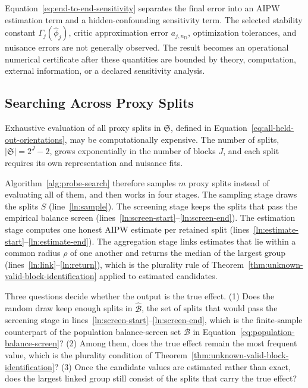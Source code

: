 Equation~\eqref{eq:end-to-end-sensitivity} separates the final error into an AIPW estimation term and a hidden-confounding sensitivity term. The selected stability constant $\Gamma_j(\widehat\phi_j)$, critic approximation error $a_{j,n_{\mathrm D}}$, optimization tolerances, and nuisance errors are not generally observed. The result becomes an operational numerical certificate after these quantities are bounded by theory, computation, external information, or a declared sensitivity analysis.

\subsection[Searching Across Proxy Splits]{Searching Across Proxy Splits}
\label{sec:random-orientation-search}
Exhaustive evaluation of all proxy splits in $\mathfrak S$, defined in Equation~\eqref{eq:all-held-out-orientations}, may be computationally expensive. The number of splits, $|\mathfrak S|=2^J-2$, grows exponentially in the number of blocks $J$, and each split requires its own representation and nuisance fits.

 Algorithm~\ref{alg:probe-search} therefore samples $m$ proxy splits instead of evaluating all of them, and then works in four stages. The sampling stage draws the splits $S$ (line~\ref{ln:sample}). The screening stage keeps the splits that pass the empirical balance screen (lines~\ref{ln:screen-start}--\ref{ln:screen-end}). The estimation stage computes one honest AIPW estimate per retained split (lines~\ref{ln:estimate-start}--\ref{ln:estimate-end}). The aggregation stage links estimates that lie within a common radius $\rho$ of one another and returns the median of the largest group (lines~\ref{ln:link}--\ref{ln:return}), which is the plurality rule of Theorem~\ref{thm:unknown-valid-block-identification} applied to estimated candidates.

Three questions decide whether the output is the true effect. (1) Does the random draw keep enough splits in $\widehat{\mathcal B}$, the set of splits that would pass the screening stage in lines~\ref{ln:screen-start}--\ref{ln:screen-end}, which is the finite-sample counterpart of the population balance-screen set $\mathcal B$ in Equation~\eqref{eq:population-balance-screen}? (2) Among them, does the true effect remain the most frequent value, which is the plurality condition of Theorem~\ref{thm:unknown-valid-block-identification}? (3) Once the candidate values are estimated rather than exact, does the largest linked group still consist of the splits that carry the true effect?

